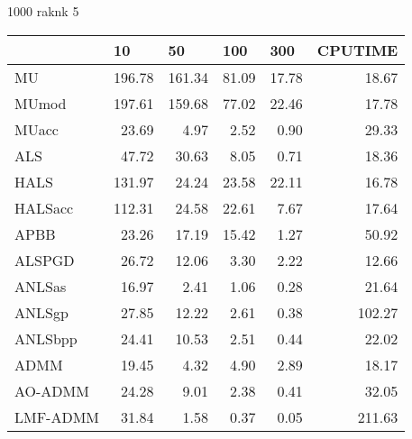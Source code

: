\documentclass{article}
\begin{document}
1000 raknk 5 
\begin{table}[H]
	\centering
	\begin{tabular}{|l|r|r|r|r|r|}
		\hline
		& \multicolumn{1}{l|}{10} & \multicolumn{1}{l|}{50} & \multicolumn{1}{l|}{100} & \multicolumn{1}{l|}{300} & \multicolumn{1}{l|}{CPUTIME} \\ \hline
		MU       & 196.78                  & 161.34                  & 81.09                    & 17.78                    & 18.67                        \\ \hline
		MUmod    & 197.61                  & 159.68                  & 77.02                    & 22.46                    & 17.78                        \\ \hline
		MUacc    & 23.69                   & 4.97                    & 2.52                     & 0.90                     & 29.33                        \\ \hline
		ALS      & 47.72                   & 30.63                   & 8.05                     & 0.71                     & 18.36                        \\ \hline
		HALS     & 131.97                  & 24.24                   & 23.58                    & 22.11                    & 16.78                        \\ \hline
		HALSacc  & 112.31                  & 24.58                   & 22.61                    & 7.67                     & 17.64                        \\ \hline
		APBB     & 23.26                   & 17.19                   & 15.42                    & 1.27                     & 50.92                        \\ \hline
		ALSPGD   & 26.72                   & 12.06                   & 3.30                     & 2.22                     & 12.66                        \\ \hline
		ANLSas   & 16.97                   & 2.41                    & 1.06                     & 0.28                     & 21.64                        \\ \hline
		ANLSgp   & 27.85                   & 12.22                   & 2.61                     & 0.38                     & 102.27                       \\ \hline
		ANLSbpp  & 24.41                   & 10.53                   & 2.51                     & 0.44                     & 22.02                        \\ \hline
		ADMM     & 19.45                   & 4.32                    & 4.90                     & 2.89                     & 18.17                        \\ \hline
		AO-ADMM  & 24.28                   & 9.01                    & 2.38                     & 0.41                     & 32.05                        \\ \hline
		LMF-ADMM & 31.84                   & 1.58                    & 0.37                     & 0.05                     & 211.63                       \\ \hline
	\end{tabular}
\end{table}
\end{document}
